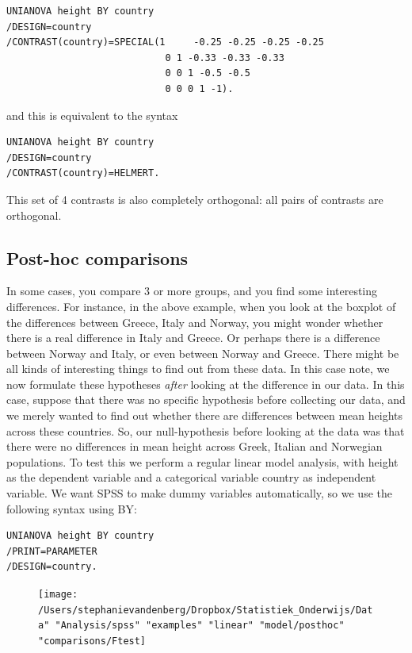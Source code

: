 \documentclass[]{report}\usepackage[]{graphicx}\usepackage[]{color}
\begin{document}
\begin{verbatim}
UNIANOVA height BY country
/DESIGN=country
/CONTRAST(country)=SPECIAL(1     -0.25 -0.25 -0.25 -0.25
                            0 1 -0.33 -0.33 -0.33
                            0 0 1 -0.5 -0.5
                            0 0 0 1 -1).
\end{verbatim}

and this is equivalent to the syntax 

\begin{verbatim}
UNIANOVA height BY country
/DESIGN=country
/CONTRAST(country)=HELMERT.
\end{verbatim}


This set of 4 contrasts is also completely orthogonal: all pairs of contrasts are orthogonal.





\subsection{Post-hoc comparisons}

In some cases, you compare 3 or more groups, and you find some interesting differences. For instance, in the above example, when you look at the boxplot of the  differences between Greece, Italy and Norway, you might wonder whether there is a real difference in Italy and Greece. Or perhaps there is a difference between Norway and Italy, or even between Norway and Greece. There might be all kinds of interesting things to find out from these data.
In this case note, we now formulate these hypotheses \textit{after} looking at the difference in our data. In this case, suppose that there was no specific hypothesis before collecting our data, and we merely wanted to find out whether there are differences between mean heights across these countries. So, our null-hypothesis before looking at the data was that there were no differences in mean height across Greek, Italian and Norwegian populations. To test this we perform a regular linear model analysis, with height as the dependent variable and a categorical variable country as independent variable. We want SPSS to make dummy variables automatically, so we use the following syntax using BY:

\begin{verbatim}
UNIANOVA height BY country
/PRINT=PARAMETER
/DESIGN=country.
\end{verbatim}



\begin{figure}[h]
    \begin{center}
       \texttt{[image: /Users/stephanievandenberg/Dropbox/Statistiek\_Onderwijs/Data" "Analysis/spss" "examples" "linear" "model/posthoc" "comparisons/Ftest]}
    \end{center}
\end{figure}
\end{document}
